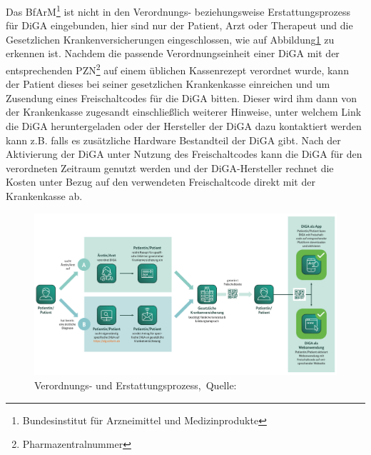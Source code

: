 Das BfArM\footnote{Bundesinstitut für Arzneimittel und Medizinprodukte} ist nicht in den Verordnungs- beziehungsweise Erstattungsprozess für DiGA eingebunden, hier sind nur der Patient, Arzt oder Therapeut und die Gesetzlichen Krankenversicherungen eingeschlossen, wie auf Abbildung\ref{fig:verordnungsprozess} zu erkennen ist.
Nachdem die passende Verordnungseinheit einer DiGA mit der entsprechenden PZN\footnote{Pharmazentralnummer} auf einem üblichen Kassenrezept verordnet wurde, kann der Patient dieses bei seiner gesetzlichen Krankenkasse einreichen und um Zusendung eines Freischaltcodes für die DiGA bitten. Dieser wird ihm dann von der Krankenkasse zugesandt einschließlich weiterer Hinweise, unter welchem Link die DiGA heruntergeladen oder der Hersteller der DiGA dazu kontaktiert werden kann z.B. falls es zusätzliche Hardware Bestandteil der DiGA gibt.
Nach der Aktivierung der DiGA unter Nutzung des Freischaltcodes kann die DiGA für den verordneten Zeitraum genutzt werden und der DiGA-Hersteller rechnet die Kosten unter Bezug auf den verwendeten Freischaltcode direkt mit der Krankenkasse ab.~\cite{digaLeistungserbringer}
\begin{figure}[H]
	\centering
	\includegraphics[width=450px, keepaspectratio]{assets/verordnungs_prozess.png}
	\caption[Verordnungs- und Erstattungsprozess]{Verordnungs- und Erstattungsprozess,~Quelle:~\cite{digaLeistungserbringer}}
	\label{fig:verordnungsprozess}
\end{figure}


